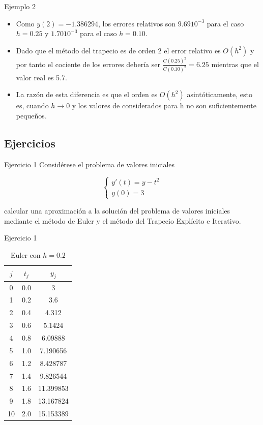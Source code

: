 		\begin{frame}{Ejemplo 2}
			\begin{itemize}
				\item Como $y(2)=-1.386294$, los errores relativos son $9.69 10^{-3}$ para el caso $h=0.25$ y $1.70 10^{-3}$ para el caso $h=0.10$.
				\item Dado que el método del trapecio es de orden 2 el error relativo es $O(h^2)$ y por tanto el cociente de los errores debería ser $\frac{C(0.25)^2}{C(0.10)^2}=6.25$ mientras que el valor real es 5.7. 
				\item La razón de esta diferencia es que el orden es $O(h^2)$ asintóticamente, esto es, cuando $h \to 0$ y los valores de considerados para h no son suficientemente pequeños.
			\end{itemize}			
		\end{frame}
		
	\subsection{Ejercicios}
	
		\begin{frame}{Ejercicio 1}
			 Considérese el problema de valores iniciales
		 
			 \begin{equation*}
			 \begin{cases}
			 y'(t) = y - t^2 \\
			 y(0) = 3
			 \end{cases}
			 \end{equation*}
		 
			 calcular una aproximación a la solución del problema de valores iniciales mediante el método de Euler y el método del Trapecio Explícito e Iterativo.						
		\end{frame}
		
		\begin{frame}{Ejercicio 1}
			\begin{table}[H]
				\centering
				\begin{tabular}{|| c | c | c ||}
					\hline
					\hline $j$ &  $t_j $ & $y_j$\\
					\hline 0 & 0.0 & 3 \\
					\hline 1 & 0.2 & 3.6  \\
					\hline 2 & 0.4 & 4.312 \\
					\hline 3 & 0.6 & 5.1424 \\
					\hline 4 & 0.8 & 6.09888 \\
					\hline 5 & 1.0 & 7.190656 \\
					\hline 6 & 1.2 & 8.428787 \\
					\hline 7 & 1.4 & 9.826544 \\
					\hline 8 & 1.6 & 11.399853 \\
					\hline 9 & 1.8 & 13.167824 \\
					\hline 10 & 2.0 & 15.153389 \\
					\hline
					\hline
				\end{tabular}
				\caption{Euler con $h=0.2$}
			\end{table}								
		\end{frame}
		
